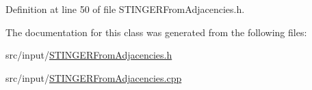 Definition at line 50 of file S\-T\-I\-N\-G\-E\-R\-From\-Adjacencies.\-h.



The documentation for this class was generated from the following files\-:\begin{DoxyCompactItemize}
\item 
src/input/\hyperlink{_s_t_i_n_g_e_r_from_adjacencies_8h}{S\-T\-I\-N\-G\-E\-R\-From\-Adjacencies.\-h}\item 
src/input/\hyperlink{_s_t_i_n_g_e_r_from_adjacencies_8cpp}{S\-T\-I\-N\-G\-E\-R\-From\-Adjacencies.\-cpp}\end{DoxyCompactItemize}
